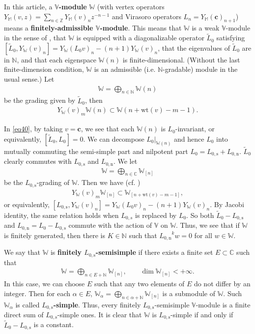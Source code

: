 \documentclass[12pt,a4paper,notitlepage]{article}
\theoremstyle{definition}
\theoremstyle{plain}
\newcommand{\wtd}{\widetilde}
\newcommand{\Vbb}{\mathbb V}
\newcommand{\Wbb}{\mathbb W}
\newcommand{\Mbb}{\mathbb M}
\newcommand{\Cbb}{\mathbb C}
\newcommand{\Nbb}{\mathbb N}
\newcommand{\Zbb}{\mathbb Z}
\newcommand{\cbf}{\mathbf c}
\newcommand{\wt}{\mathrm{wt}}
\newcommand{\Lss}{{L_{0,\mathrm{s}}}}
\newcommand{\Lni}{{L_{0,\mathrm{n}}}}
\numberwithin{equation}{section}
\begin{document}
In this article,  a \textbf{$\Vbb$-module} $\Wbb$ (with vertex operators $Y_\Mbb(v,z)=\sum_{n\in\Zbb}Y_\Mbb(v)_nz^{-n-1}$ and Virasoro operators $L_n=Y_\Mbb(\cbf)_{n+1}$) means a \textbf{finitely-admissible $\Vbb$-module}. This means that $\Wbb$ is a weak $\Vbb$-module in the sense of \cite{DLM97}, that $\Wbb$ is equipped with a diagonalizable operator $\wtd L_0$ satisfying $[\wtd L_0,Y_\Wbb(v)_n]=Y_\Wbb(L_0 v)_n-(n+1)Y_\Wbb(v)_n$, \index{L0@$\wtd L_0$}  that the eigenvalues of $\wtd L_0$ are in $\Nbb$, and that each eigenspace $\Wbb(n)$ is finite-dimensional. (Without the last finite-dimension condition, $\Wbb$ is an admissible (i.e. $\Nbb$-gradable) module in the usual sense.) Let \index{W@$\Wbb(n),\Wbb_{(n)}$}
\begin{align*}
\Wbb=\bigoplus_{n\in\Nbb}\Wbb(n)	
\end{align*}
be the grading given by $\wtd L_0$, then \begin{align}
Y_\Wbb(v)_m\Wbb(n)\subset \Wbb(n+\wt(v)-m-1).\label{eq40}
\end{align}

In \eqref{eq40}, by taking $v=\cbf$, we see that  each $\Wbb(n)$ is $L_0$-invariant, or equivalently, $[\wtd L_0,L_0]=0$. We can decompose $L_0|_{\Wbb(n)}$ and hence $L_0$ into mutually commuting the semi-simple part and nilpotent part $L_0=\Lss+\Lni$.  \index{L0@$\Lss,\Lni$}  $\wtd L_0$ clearly commutes with $\Lss$ and $\Lni$. We let
\begin{align*}
\Wbb=\bigoplus_{n\in\Cbb}\Wbb_{[n]}	
\end{align*}
be the $\Lss$-grading of $\Wbb$. Then we have (cf. \cite[Prop. 2.19]{HLZ14})
\begin{align}
	Y_\Wbb(v)_m\Wbb_{[n]}\subset \Wbb_{[n+\wt(v)-m-1]},
\end{align}
or equivalently, $[\Lss,Y_\Wbb(v)_n]=Y_\Wbb(L_0 v)_n-(n+1)Y_\Wbb(v)_n$. By Jacobi identity, the same relation holds when $L_{0,s}$ is replaced by $L_0$. So both $\wtd L_0-\Lss$ and $\Lni=L_0-\Lss$ commute with the action of $\Vbb$ on $\Wbb$. Thus, we see that if $\Wbb$ is finitely generated, then there is $K\in\Nbb$ such that $\Lni^kw=0$ for all $w\in\Wbb$.

We say that $\Wbb$ is \textbf{finitely $\Lss$-semisimple} if there exists a finite set $E\subset\Cbb$ such that 
\begin{align*}
\Wbb=\bigoplus_{n\in E+\Nbb}\Wbb_{[n]},\qquad \dim\Wbb_{[n]}<+\infty.
\end{align*}
In this case, we can choose $E$ such that any two elements of $E$ do not differ by an integer. Then for each $\alpha\in E$, $\Wbb_\alpha=\bigoplus_{n\in\alpha+\Nbb}\Wbb_{[n]}$ is a submodule of $\Wbb$. Such $\Wbb_\alpha$ is called \textbf{$\Lss$-simple}. Thus, every finitely $\Lss$-semisimple $\Vbb$-module is a finite direct sum of $\Lss$-simple ones. It is clear that $\Wbb$ is $\Lss$-simple if and only if  $\wtd L_0-\Lss$ is a constant.
\end{document}
